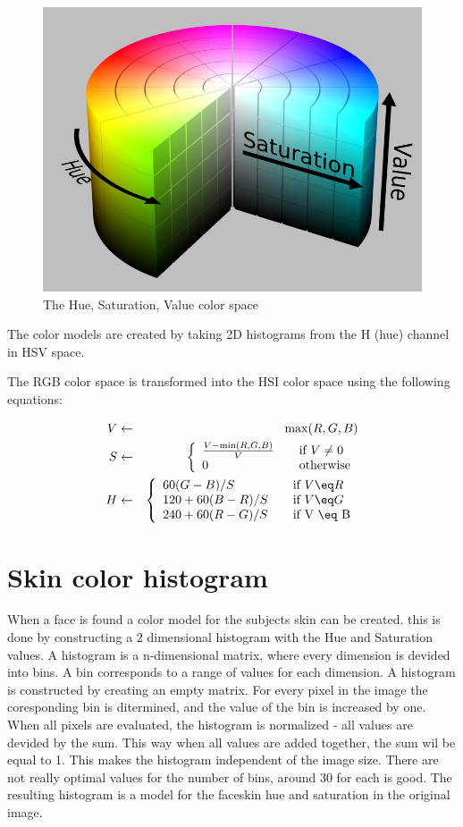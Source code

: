 \begin{figure}[htbp]
	\center
	\includegraphics[width=0.4\linewidth]{figures/hsv.png}
	\caption{The Hue, Saturation, Value color space}
	\label{fig:hsv}
\end{figure}

The color models are created by taking 2D histograms from the H (hue) channel in HSV space.





The RGB color space is transformed into the HSI color space using the following equations:


\begin{eqnarray*}
  V & \leftarrow & \max(R,G,B) \\
  S & \leftarrow & \left\{
  \begin{array}{l l}
    \frac{V-\min(R, G, B)}{V} & \quad \text{if $V \neq 0$} \\
    0 						  & \quad \text{otherwise} \\
  \end{array} \right.\\
  H & \leftarrow & \left\{
  \begin{array}{l l}
    60(G - B)/S     & \quad \text{if $V \eq R$} \\
    120 + 60(B-R)/S & \quad \text{if $V \eq G$} \\
    240 + 60(R-G)/S & \quad \text{if V \eq B} \\
  \end{array} \right.\\
\end{eqnarray*}
  



\section{Skin color histogram}
When a face is found a color model for the subjects skin can be created. this is done by constructing a 2 dimensional histogram with the Hue and Saturation values. A histogram is a n-dimensional matrix, where every dimension is devided into bins. A bin corresponds to a range of values for each dimension. A histogram is constructed by creating an empty matrix. For every pixel in the image the coresponding bin is ditermined, and the value of the bin is increased by one. When all pixels are evaluated, the histogram is normalized - all values are devided by the sum. This way when all values are added together, the sum wil be equal to 1. This makes the histogram independent of the image size. There are not really optimal values for the number of bins, around 30 for each is good. The resulting histogram is a model for the faceskin hue and saturation in the original image.

